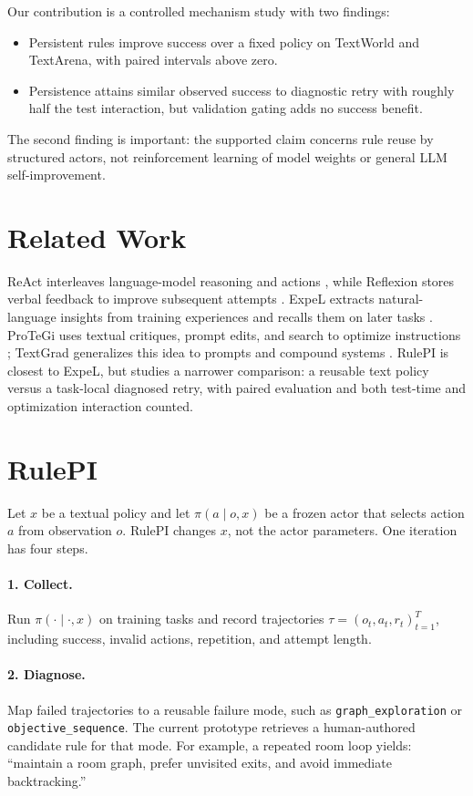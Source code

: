 \documentclass[11pt]{article}
\begin{document}
Our contribution is a controlled mechanism study with two findings:
\begin{itemize}
    \item Persistent rules improve success over a fixed policy on TextWorld and TextArena, with paired intervals above zero.
    \item Persistence attains similar observed success to diagnostic retry with roughly half the test interaction, but validation gating adds no success benefit.
\end{itemize}
The second finding is important: the supported claim concerns rule reuse by structured actors, not reinforcement learning of model weights or general LLM self-improvement.

\section{Related Work}

ReAct interleaves language-model reasoning and actions \citep{yao2023react}, while Reflexion stores verbal feedback to improve subsequent attempts \citep{shinn2023reflexion}.
ExpeL extracts natural-language insights from training experiences and recalls them on later tasks \citep{zhao2023expel}.
ProTeGi uses textual critiques, prompt edits, and search to optimize instructions \citep{pryzant2023protegi}; TextGrad generalizes this idea to prompts and compound systems \citep{yuksekgonul2025textgrad}.
RulePI is closest to ExpeL, but studies a narrower comparison: a reusable text policy versus a task-local diagnosed retry, with paired evaluation and both test-time and optimization interaction counted.

\section{RulePI}
\label{sec:method}

Let $x$ be a textual policy and let $\pi(a\mid o,x)$ be a frozen actor that selects action $a$ from observation $o$.
RulePI changes $x$, not the actor parameters.
One iteration has four steps.

\paragraph{1. Collect.}
Run $\pi(\cdot\mid\cdot,x)$ on training tasks and record trajectories $\tau=(o_t,a_t,r_t)_{t=1}^{T}$, including success, invalid actions, repetition, and attempt length.

\paragraph{2. Diagnose.}
Map failed trajectories to a reusable failure mode, such as \texttt{graph\_exploration} or \texttt{objective\_sequence}.
The current prototype retrieves a human-authored candidate rule for that mode.
For example, a repeated room loop yields: ``maintain a room graph, prefer unvisited exits, and avoid immediate backtracking.''
\end{document}
